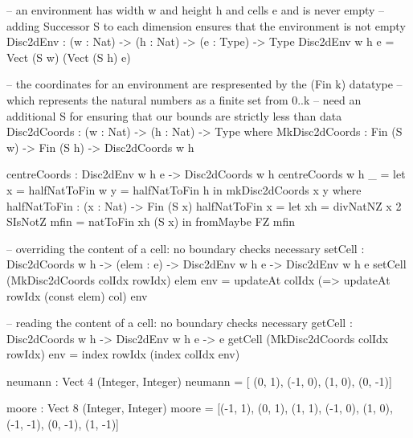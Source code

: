 \begin{HaskellCode}
-- an environment has width w and height h and cells e and is never empty
-- adding Successor S to each dimension ensures that the environment is not empty
Disc2dEnv : (w : Nat) -> (h : Nat) -> (e : Type) -> Type
Disc2dEnv w h e = Vect (S w) (Vect (S h) e) 

-- the coordinates for an environment are respresented by the (Fin k) datatype
-- which represents the natural numbers as a finite set from  0..k
-- need an additional S for ensuring that our bounds are strictly less than
data Disc2dCoords : (w : Nat) -> (h : Nat) -> Type where
  MkDisc2dCoords : Fin (S w) -> Fin (S h) -> Disc2dCoords w h
  
centreCoords : Disc2dEnv w h e -> Disc2dCoords w h
centreCoords {w} {h} _ =
    let x = halfNatToFin w
        y = halfNatToFin h
    in  mkDisc2dCoords x y
  where
    halfNatToFin : (x : Nat) -> Fin (S x)
    halfNatToFin x = 
      let xh   = divNatNZ x 2 SIsNotZ 
          mfin = natToFin xh (S x)
      in  fromMaybe FZ mfin
      
-- overriding the content of a cell: no boundary checks necessary
setCell :  Disc2dCoords w h
        -> (elem : e)
        -> Disc2dEnv w h e
        -> Disc2dEnv w h e
setCell (MkDisc2dCoords colIdx rowIdx) elem env 
    = updateAt colIdx (\col => updateAt rowIdx (const elem) col) env
 
-- reading the content of a cell: no boundary checks necessary
getCell :  Disc2dCoords w h
        -> Disc2dEnv w h e
        -> e
getCell (MkDisc2dCoords colIdx rowIdx) env
    = index rowIdx (index colIdx env)
    
neumann : Vect 4 (Integer, Integer)
neumann = [         (0,  1), 
           (-1,  0),         (1,  0),
                    (0, -1)]

moore : Vect 8 (Integer, Integer)
moore = [(-1,  1), (0,  1), (1,  1),
         (-1,  0),          (1,  0),
         (-1, -1), (0, -1), (1, -1)]


\end{HaskellCode}
